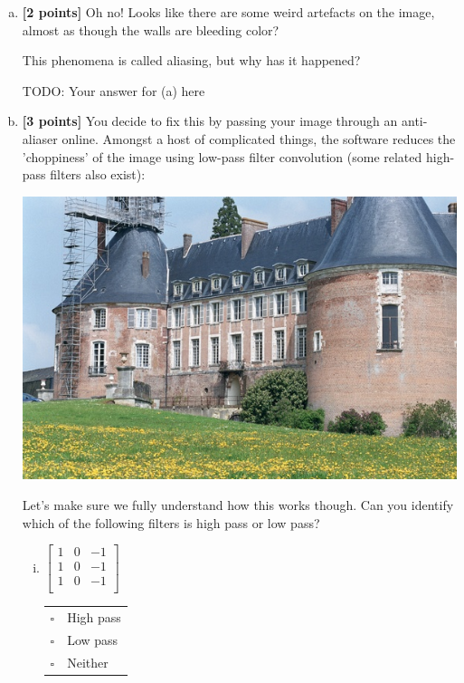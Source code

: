 \begin{enumerate}[(a)]
\item \textbf{[2 points]} Oh no! Looks like there are some weird artefacts on the image, almost as though the walls are bleeding color? 
    
    \begin{tcolorbox}[colback=orange!5!white,colframe=orange!75!black]
This phenomena is called aliasing, but why has it happened?
\end{tcolorbox}

\begin{mdframed}
    TODO: Your answer for (a) here
\end{mdframed}

\item \textbf{[3 points]}
You decide to fix this by passing your image through an anti-aliaser online. Amongst a host of complicated things, the software reduces the 'choppiness' of the image using low-pass filter convolution (some related high-pass filters also exist):

\includegraphics[width=\textwidth * 5/10]{images/castle-after.jpg}

\begin{tcolorbox}[colback=orange!5!white,colframe=orange!75!black]
Let's make sure we fully understand how this works though. Can you identify which of the following filters is high pass or low pass?
\end{tcolorbox}

\begin{enumerate}[(i)]
\item
 $\begin{bmatrix}
    1 & 0 & -1 \\
    1 & 0 & -1 \\
    1 & 0 & -1 \\
 \end{bmatrix}$
\begin{tabular}[h]{ll}
$\square$ & High pass \\
$\square$ & Low pass \\
$\square$ & Neither \\
\end{tabular}


\end{enumerate}
\end{enumerate}
